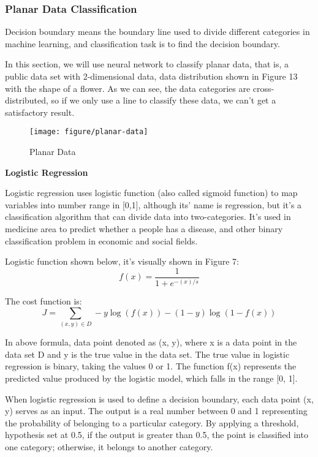 \documentclass{article}
\begin{document}
\newpage
	\subsubsection{Planar Data Classification}

    Decision boundary means the boundary line used to divide different categories in machine learning, and classification task is to find the decision boundary.

    In this section, we will use neural network to classify planar data, that is, a public data set with 2-dimensional data, data distribution shown in Figure 13 with the shape of a flower. As we can see, the data categories are cross-distributed, so if we only use a line to classify these data, we can't get a satisfactory result.


    \begin{figure}[htbp]
        \centering
        \texttt{[image: figure/planar-data]}
        \caption{Planar Data}
        \end{figure}

    \noindent
    \textbf{Logistic Regression}\\
    \noindent

Logistic regression uses logistic function (also called sigmoid function) to map variables into number range in [0,1], although its' name is regression, but it's a classification algorithm that can divide data into two-categories. It's used in medicine area to predict whether a people has a disease, and other binary classification problem in economic and social fields.

Logistic function shown below, it's visually shown in Figure 7:
\begin{equation}
f(x)=\frac{1}{1+e^{-(x) / s}}
\end{equation}

The cost function is:
\begin{equation}
J = \sum_{(x, y) \in D}-y \log \left(f(x)\right)-(1-y) \log \left(1-f(x)\right)
\end{equation}

In above formula, data point denoted as (x, y), where x is a data point in the data set D and y is the true value in the data set. The true value in logistic regression is binary, taking the values 0 or 1. The function f(x) represents the predicted value produced by the logistic model, which falls in the range [0, 1].

When logistic regression is used to define a decision boundary, each data point (x, y) serves as an input. The output is a real number between 0 and 1 representing the probability of belonging to a particular category. By applying a threshold, hypothesis set at 0.5, if the output is greater than 0.5, the point is classified into one category; otherwise, it belongs to another category.
\end{document}

